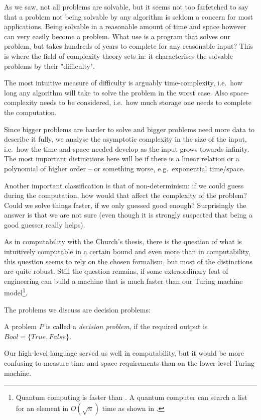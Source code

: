 As we saw, not all problems are solvable, but it seems not too farfetched to
say that a problem not being solvable by any algorithm is seldom a concern for
most applications. Being solvable in a reasonable amount of time and space
however can very easily become a problem. What use is a program that solves our
problem, but takes hundreds of years to complete for any reasonable input? This
is where the field of complexity theory sets in: it characterises the solvable
problems by their "difficulty".

The most intuitive measure of difficulty is arguably time-complexity, i.e.\ how
long any algorithm will take to solve the problem in the worst case. Also
space-complexity needs to be considered, i.e.\ how much storage one needs to
complete the computation.

Since bigger problems are harder to solve and bigger problems need more data to
describe it fully, we analyse the asymptotic complexity in the size of the
input, i.e.\ how the time and space needed develop as the input grows towards
infinity. The most important distinctions here will be if there is a linear
relation or a polynomial of higher order -- or something worse, e.g.\ exponential
time/space.

Another important classification is that of non-determinism: if we could guess
during the computation, how would that affect the complexity of the problem?
Could we solve things faster, if we only guessed good enough? Surprisingly the
answer is that we are not sure (even though it is strongly suspected that being
a good guesser really helps).

As in computability with the Church's thesis, there is the question of what is
intuitively computable in a certain bound and even more than in computability,
this question seems to rely on the chosen formalism, but most of the
distinctions are quite robust. Still the question remains, if some
extraordinary feat of engineering can build a machine that is much faster than
our Turing machine model\footnote{Quantum computing is faster than \TM\@. A 
	quantum computer can search a list for an element in $O(\sqrt{n})$ time as 
	shown in \cite{grover1996fast}.}. 

The problems we discuss are decision problems:
\begin{defn}
	A problem $P$ is called a {\em decision problem}, if the required output is 
	$Bool = \{True, False\}$.
\end{defn}

Our high-level \WHILE language served us well in computability, but it would
be more confusing to measure time and space requirements than on the
lower-level Turing machine.

